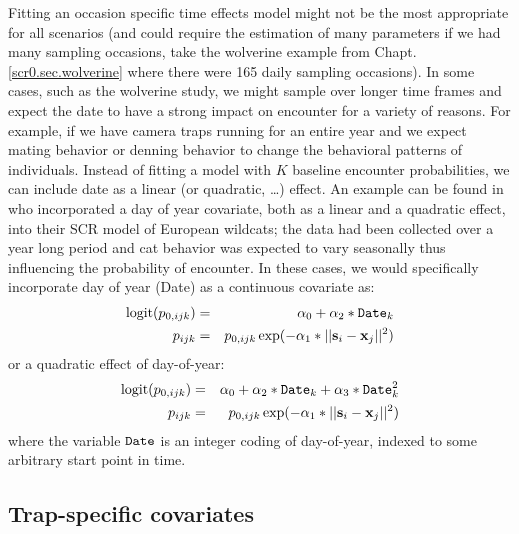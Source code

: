Fitting an occasion specific time effects model might not be the most
appropriate for all scenarios (and could require the estimation of
many parameters if we had many sampling occasions, take the wolverine
example from Chapt. \ref{scr0.sec.wolverine} where there were 165
daily sampling occasions).  In some cases, such as the wolverine
study, we might sample over longer time frames and expect the date to
have a strong impact on encounter for a variety of reasons.  For
example, if we have camera traps running for an entire year and we
expect mating behavior or denning behavior to change the behavioral
patterns of individuals. Instead of fitting a model with $K$ baseline
encounter probabilities, we can include date as a linear (or
quadratic, \ldots) effect. An example can be found in
\citet{kery_etal:2011} who incorporated a day of year covariate, both
as a linear and a quadratic effect, into their SCR model of European
wildcats; the data had been collected over a year long period and cat
behavior was expected to vary seasonally thus influencing the
probability of encounter.  In these cases, we would specifically
incorporate day of year (Date) as a continuous covariate as:
\begin{eqnarray*}
\mbox{logit}(p_{0,ijk}) &=& \alpha_0 + \alpha_2*\mbox{\tt Date}_{k} \\
p_{ijk} &= &p_{0, ijk} \exp(- \alpha_1*||{\bf s}_{i}-{\bf x}_{j}||^2)
\end{eqnarray*}
or a quadratic effect of day-of-year:
\begin{eqnarray*}
\mbox{logit}(p_{0,ijk})& =& \alpha_0 + \alpha_2*\mbox{\tt Date}_{k}
 + \alpha_3*\mbox{\tt Date}_{k}^{2} \\
p_{ijk} &= &p_{0,ijk} \exp(- \alpha_{1}*||{\bf s}_{i}-{\bf x}_{j}||^2)
\end{eqnarray*}
where the variable $\mbox{\tt Date}$ is an integer coding of
day-of-year, indexed to some arbitrary start point in time.



\subsection{Trap-specific covariates}

